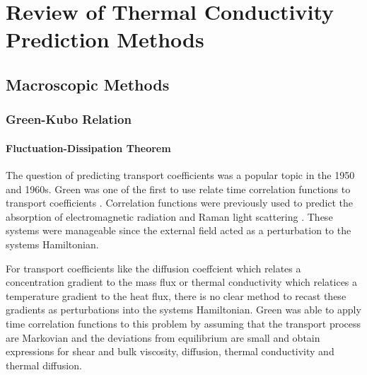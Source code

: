 \chapter{Review of Thermal Conductivity Prediction Methods}


\section{Macroscopic Methods}
\subsection{Green-Kubo Relation}
\subsubsection{Fluctuation-Dissipation Theorem}

The question of predicting transport coefficients was a popular topic in the 1950 and 1960s. Green was one of the first to use relate time correlation functions to transport coefficients \cite{green1954markoff}. Correlation functions were previously used to predict the absorption of electromagnetic radiation \cite{gordon1968correlation} and Raman light scattering \cite{gordon1965molecular}. These systems were manageable since the external field acted as a perturbation to the systems Hamiltonian.

For transport coefficients like the diffusion coeffcient which relates a concentration gradient to the mass flux or thermal conductivity which relatices a temperature gradient to the heat flux, there is no clear method to recast these gradients as perturbations into the systems Hamiltonian\cite {mcquarrie}. Green was able to apply time correlation functions to this problem by assuming that the transport process are Markovian and the deviations from equilibrium are small \cite{green1954markoff} and obtain expressions for shear and bulk viscosity, diffusion, thermal conductivity and thermal diffusion.

